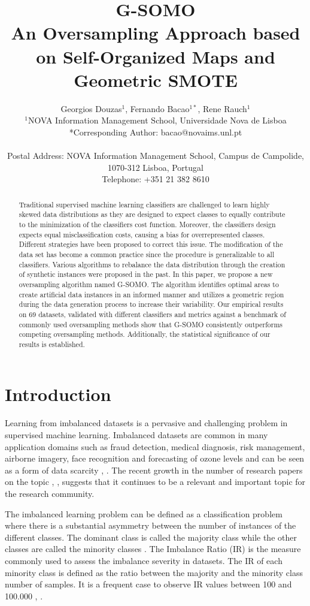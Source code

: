 \documentclass[parskip=full]{scrartcl}
\title{G-SOMO \\ \LARGE{An Oversampling Approach based on Self-Organized Maps and Geometric SMOTE}}
\author{
	Georgios Douzas\(^{1}\), Fernando Bacao\(^{1*}\), Rene Rauch\(^{1}\)
	\\
	\small{\(^{1}\)NOVA Information Management School, Universidade Nova de Lisboa}
	\\
	\small{*Corresponding Author: bacao@novaims.unl.pt}
	\\
	\\
	\small{Postal Address: NOVA Information Management School, Campus de Campolide, 1070-312 Lisboa, Portugal}
	\\
	\small{Telephone: +351 21 382 8610}
}
\date{}
\begin{document}
\maketitle

\begin{abstract}
	Traditional supervised machine learning classifiers are challenged to learn highly skewed data distributions as they are designed to expect classes to equally contribute to the minimization of the classifiers cost function. Moreover, the classifiers design expects equal misclassification costs, causing a bias for overrepresented classes. Different strategies have been proposed to correct this issue. The modification of the data set has become a common practice since the procedure is generalizable to all classifiers. Various algorithms to rebalance the data distribution through the creation of synthetic instances were proposed in the past. In this paper, we propose a new oversampling algorithm named G-SOMO. The algorithm identifies optimal areas to create artificial data instances in an informed manner and utilizes a geometric region during the data generation process to increase their variability. Our empirical results on 69 datasets, validated with different classifiers and metrics against a benchmark of commonly used oversampling methods show that G-SOMO consistently outperforms competing oversampling methods. Additionally, the statistical significance of our results is established.
\end{abstract}

\section{Introduction}

Learning from imbalanced datasets is a pervasive and challenging problem in supervised machine learning. Imbalanced datasets are common in many application domains such as fraud detection, medical diagnosis, risk management, airborne imagery, face recognition and forecasting of ozone levels and can be seen as a form of data scarcity \cite{Vong2014}, \cite{He2009}. The recent growth in the number of research papers on the topic \cite{Haixiang2017}, \cite{Fernandez2018}, suggests that it continues to be a relevant and important topic for the research community.

The imbalanced learning problem can be defined as a classification problem where there is a substantial asymmetry between the number of instances of the different classes. The dominant class is called the majority class while the other classes are called the minority classes \cite{Chawla2003}. The Imbalance Ratio (IR) is the measure commonly used to assess the imbalance severity in datasets. The IR of each minority class is defined as the ratio between the majority and the minority class number of samples. It is a frequent case to observe IR values between 100 and 100.000 \cite{Chawla2002}, \cite{Barua2014}.
\end{document}
